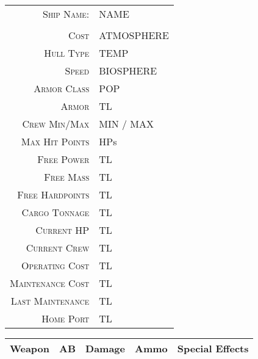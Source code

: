 \documentclass[10pt,letterpaper,twocolumn]{article}
\begin{document}
\begin{table}[h]
\begin{tabularx}{\linewidth}{ r | X |}
    \cline{2-2}
    \textsc{Ship Name:} & NAME \\
    \cline{2-2}
    \multicolumn{2}{c}{} \\
    \cline{2-2}
    \textsc{Cost} & ATMOSPHERE \\
    \cline{2-2}
    \textsc{Hull Type} & TEMP \\
    \cline{2-2}
    \textsc{Speed} & BIOSPHERE \\
    \cline{2-2}
    \textsc{Armor Class} & POP \\
    \cline{2-2}
    \textsc{Armor} & TL \\
    \cline{2-2}
    \textsc{Crew Min/Max} & MIN / MAX \\
    \cline{2-2}
    \textsc{Max Hit Points} &  HPs \\
    \cline{2-2}
    \textsc{Free Power} & TL \\
    \cline{2-2}
    \textsc{Free Mass} & TL \\
    \cline{2-2}
    \textsc{Free Hardpoints} & TL \\
    \cline{2-2}
    \textsc{Cargo Tonnage} & TL \\
    \cline{2-2}
    \textsc{Current HP} & TL \\
    \cline{2-2}
    \textsc{Current Crew} & TL \\
    \cline{2-2}
    \textsc{Operating Cost} & TL \\
    \cline{2-2}
    \textsc{Maintenance Cost} & TL \\
    \cline{2-2}
    \textsc{Last Maintenance} & TL \\
    \cline{2-2}
    \textsc{Home Port} & TL \\
    \cline{2-2}
\end{tabularx}
\end{table}

\begin{table*}[b]
    \begin{tabularx}{\linewidth}{| c | c | c | c | X |}
        \hline
        Weapon & AB & Damage & Ammo & Special Effects \\
        \hline
    \end{tabularx}
\end{table*}
\end{document}
